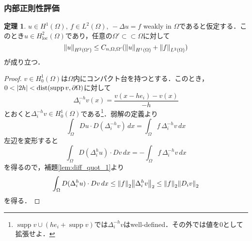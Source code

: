 \documentclass[a4paper]{ltjsarticle}
\newcommand{\Om}{\Omega}
\newcommand{\pOm}{\partial\Omega}
\newcommand{\ssubset}{\subset\subset}
\newcommand{\loc}{\text{loc}}
\newcommand{\1}{\mathbbm{1}}
\DeclareMathOperator{\dist}{\mathrm{dist}}
\DeclareMathOperator{\supp}{\mathrm{supp}}
\numberwithin{equation}{section}
\theoremstyle{definition}
\newtheorem{thm}{定理}[section]
\begin{document}
\subsubsection{内部正則性評価}
\begin{thm}
    $u\in H^1(\Om),\ f\in L^2(\Om),\ -\Delta u=f$ weakly in $\Om$であると仮定する．このとき$u\in H^2_{\loc}(\Om)$であり，任意の$\Om'\ssubset \Om$に対して
    \begin{equation}
        \norm{u}_{H^2(\Om')}\leq C_{n,\Om,\Om'}(\norm{u}_{H^1(\Om)}+\norm{f}_{L^2(\Om)})
    \end{equation}
    が成り立つ．
\end{thm}
\begin{proof}
    $v\in H^1_0(\Om)$は$\Om$内にコンパクト台を持つとする．このとき，$0<\abs{2h}<\dist(\supp v,\pOm)$に対して
    \begin{equation}
        \Delta^{-h}_{i}v(x)=\frac{v(x-he_i)-v(x)}{-h}
    \end{equation}
    とおくと$\Delta^{-h}_{i}v\in H^1_0(\Om)$である\footnote{$\supp v\cup (he_i+\supp v)$では$\Delta^{-h}_iv$はwell-defined．その外では値を0として拡張せよ．}．弱解の定義より
    \begin{equation}
        \int_{\Om}Du\cdot D(\Delta^{-h}_iv)\,dx=\int_{\Om}f\,\Delta^{-h}_iv\,dx
    \end{equation}
    左辺を変形すると
    \begin{equation}
        \int_{\Om}D(\Delta^h_iu)\cdot Dv\,dx=-\int_{\Om}f\,\Delta_{i}^{-h}v\,dx 
    \end{equation}
    を得るので，補題\ref{lem:diff_quot_1}より
    \begin{equation}
        \int_{\Om}D(\Delta^h_iu)\cdot Dv\,dx\leq \norm{f}_{2}\norm{\Delta^h_iv}_{2}\leq \norm{f}_2\norm{D_iv}_{2}
    \end{equation}
    を得る．
    

\end{proof}
\end{document}
